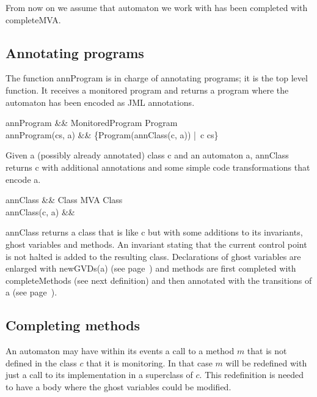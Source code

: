 \documentclass[a4paper,10pt]{article}
\begin{document}
From now on we assume that automaton we work with has been completed with \<completeMVA\>.

\subsection{Annotating programs}\label{sec:AnnPrograms}
The function \<annProgram\> is in charge of annotating programs; it is the top level function. It receives a
monitored program and returns a program where the automaton has been encoded as JML annotations.

\begin{haskell}\label{def:annProgram}
annProgram &\ofType& MonitoredProgram \to Program\\
annProgram(cs, a) &\eqdef& \{Program(annClass(c, a)) |\, c \in cs\}
\end{haskell}

Given a (possibly already annotated) class \<c\> and an automaton \<a\>, \<annClass\> returns \<c\> with
additional annotations and some simple code transformations that encode \<a\>.

\begin{haskell}\label{def:annClass}
annClass &\ofType& Class \times MVA \to Class\\
annClass(c, a) &\eqdef&\relax
\end{haskell}

\<annClass\> returns a class that is like \<c\> but with some additions to its invariants, ghost variables and
methods. 
An invariant stating that the current control point is not \<halted\> is added to the resulting class.
Declarations of ghost variables are enlarged with \<newGVDs(a)\> (see page~\pageref{def:newGVDs}) and methods
are first completed with \<completeMethods\> (see next definition) and then annotated with the transitions of
\<a\> (see page~\pageref{def:annMethods}).


\subsection{Completing methods}\label{sec:CompMethods}
An automaton may have within its events a call to a method $m$ that is not defined in the class $c$ that it
is monitoring. In that case $m$ will be redefined with just a call to its implementation in a superclass of
$c$. This redefinition is needed to have a body where the ghost variables could be modified.
\end{document}
